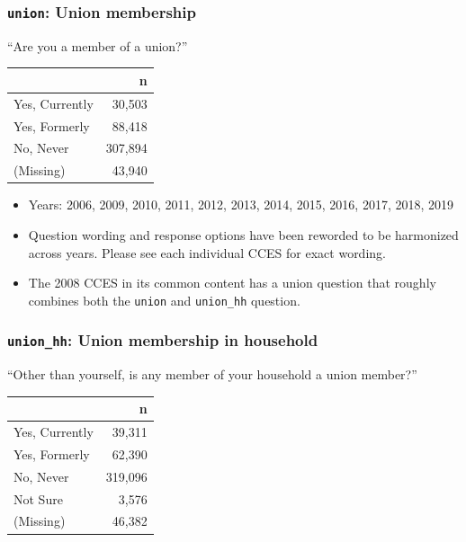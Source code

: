 \documentclass[10pt,article,oneside]{memoir}
\theoremstyle{definition}
\begin{document}
\hypertarget{union-union-membership}{%
\subsubsection{\texorpdfstring{\texttt{union}: Union
membership}{union: Union membership}}\label{union-union-membership}}

``Are you a member of a union?''

\begin{table}[H]
\centering
\begin{tabular}{lr}
\toprule
 & n\\
\midrule
Yes, Currently & 30,503\\
Yes, Formerly & 88,418\\
No, Never & 307,894\\
(Missing) & 43,940\\
\bottomrule
\end{tabular}
\end{table}

\begin{itemize}
\tightlist
\item
  Years: 2006, 2009, 2010, 2011, 2012, 2013, 2014, 2015, 2016, 2017,
  2018, 2019
\item
  Question wording and response options have been reworded to be
  harmonized across years. Please see each individual CCES for exact
  wording.
\item
  The 2008 CCES in its common content has a union question that roughly
  combines both the \texttt{union} and \texttt{union\_hh} question.
\end{itemize}

\hypertarget{union_hh-union-membership-in-household}{%
\subsubsection{\texorpdfstring{\texttt{union\_hh}: Union membership in
household}{union\_hh: Union membership in household}}\label{union_hh-union-membership-in-household}}

``Other than yourself, is any member of your household a union member?''

\begin{table}[H]
\centering
\begin{tabular}{lr}
\toprule
 & n\\
\midrule
Yes, Currently & 39,311\\
Yes, Formerly & 62,390\\
No, Never & 319,096\\
Not Sure & 3,576\\
(Missing) & 46,382\\
\bottomrule
\end{tabular}
\end{table}
\end{document}

